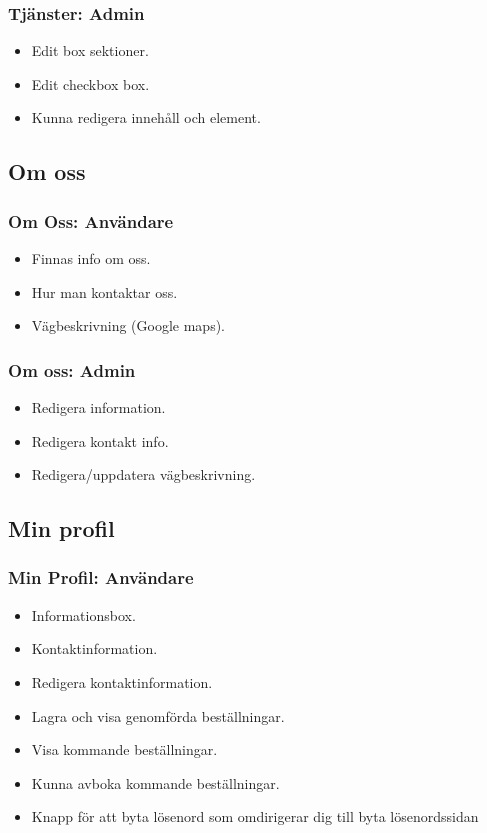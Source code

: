 \documentclass[11pt, titlepage, oneside, a4paper]{article}	%
\begin{document}
	\subsubsection*{Tjänster: Admin}
	\begin{itemize}
		\item Edit box sektioner.
		\item Edit checkbox box.
		\item Kunna redigera innehåll och element.
	\end{itemize}

\subsection{Om oss}
	\subsubsection*{Om Oss: Användare}
	\begin{itemize}
		\item Finnas info om oss.
		\item Hur man kontaktar oss.
		\item Vägbeskrivning (Google maps).
	\end{itemize} 
	
	\subsubsection*{Om oss: Admin}
	\begin{itemize}
		\item Redigera information.
		\item Redigera kontakt info.
		\item Redigera/uppdatera vägbeskrivning.
	\end{itemize}

\subsection{Min profil}
	\subsubsection*{Min Profil: Användare}
	\begin{itemize}
		\item Informationsbox.
		\item Kontaktinformation.
		\item Redigera kontaktinformation.
		\item Lagra och visa genomförda beställningar.
		\item Visa kommande beställningar.
		\item Kunna avboka kommande beställningar.
		\item Knapp för att byta lösenord som omdirigerar dig till byta lösenordssidan
	\end{itemize} 
\end{document}

